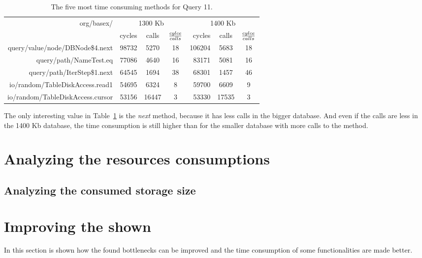 \begin {table}[htpb] 
  \begin{center}
\hspace*{-0.5cm}
\begin {tabular} {|r|r|c|c|r|c|c|}
  	\hline
	\multirow{2}{*}{org/basex/}&\multicolumn{3}{c}{1300 Kb}&\multicolumn{3}{|c|}{1400 Kb}\\
	\cline{2-7}
	&cycles&calls&${cylce \over calls}$&cycles&calls&${cylce \over calls}$\\
	\hline
	\hline
	query/value/node/DBNode\$4.next&98732&5270&18&106204&5683&18\\
	\hline
	query/path/NameTest.eq&77086&4640&16&83171&5081&16\\
	\hline
	query/path/IterStep\$1.next&64545&1694&38&68301&1457&46\\
	\hline
	io/random/TableDiskAccess.read1&54695&6324&8&59700&6609&9\\
	\hline
	io/random/TableDiskAccess.cursor&53156&16447&3&53330&17535&3\\
	\hline
\end {tabular}
\caption {The five most time consuming methods for Query 11.}
\label {tab:traceview-q11-methods}
\end{center}
\end {table}
The only interesting value in Table~\ref{tab:traceview-q11-methods} is the \textit{next} method, because it has less calls in the bigger database.
And even if the calls are less in the 1400 Kb database, the time consumption is still higher than for the smaller database with more calls to the method.






\section{Analyzing the resources consumptions}
\label{sec:analysis:analyszing-the-resource-consumption}
\subsection{Analyzing the consumed storage size}
\label{sec:analysis:analyzing-the-consumed-storage-size}
\section{Improving the shown }
\label{sec:improving}
In this section is shown how the found bottlenecks can be improved and the time consumption of some functionalities are made better.
